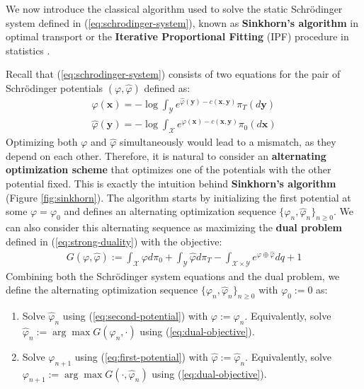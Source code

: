 \documentclass{article}
\newcommand{\boldtext}[1]{\textbf{\textcolor{MyGreen}{#1}}}
\begin{document}
We now introduce the classical algorithm used to solve the static Schrödinger system defined in (\ref{eq:schrodinger-system}), known as \textbf{Sinkhorn's algorithm} in optimal transport \citep{sinkhorn1967diagonal, knight2008sinkhorn, nutz2021introduction, cuturi2013sinkhorn} or the \textbf{Iterative Proportional Fitting} (IPF) procedure in statistics \citep{fortet1940resolution, kullback1968probability, ruschendorf1995convergence}.

Recall that (\ref{eq:schrodinger-system}) consists of two equations for the pair of Schrödinger potentials $(\varphi, \hat{\varphi})$ defined as:
\begin{align}
    \varphi(\boldsymbol{x})=-\log\int_{\mathcal{Y}}e^{\hat{\varphi}(\boldsymbol{y})-c(\boldsymbol{x},\boldsymbol{y})}\pi_T(d\boldsymbol{y})\tag{First Potential}\label{eq:first-potential}\\
    \hat{\varphi}(\boldsymbol{y})=-\log\int_{\mathcal{X}}e^{\varphi(\boldsymbol{x})-c(\boldsymbol{x},\boldsymbol{y})}\pi_0(d\boldsymbol{x})\tag{Second Potential}\label{eq:second-potential}
\end{align}
Optimizing both $\varphi$ and $\hat{\varphi}$ simultaneously would lead to a mismatch, as they depend on each other. Therefore, it is natural to consider an \textbf{alternating optimization scheme} that optimizes one of the potentials with the other potential fixed. This is exactly the intuition behind \boldtext{Sinkhorn's algorithm} (Figure \ref{fig:sinkhorn}). The algorithm starts by initializing the first potential at some $\varphi=\varphi_0$ and defines an alternating optimization sequence $\{\varphi_n, \hat{\varphi}_n\}_{n\geq 0}$. We can also consider this alternating sequence as maximizing the \textbf{dual problem} defined in (\ref{eq:strong-duality}) with the objective:
\begin{align}
    G(\varphi, \hat{\varphi}):=\int_{\mathcal{X}}\varphi d\pi_0+\int_{\mathcal{Y}}\hat{\varphi} d\pi_T-\int_{\mathcal{X}\times\mathcal{Y}} e^{\varphi\oplus \hat{\varphi}}dq+1\tag{Dual Objective}\label{eq:dual-objective}
\end{align}
Combining both the Schrödinger system equations and the dual problem, we define the alternating optimization sequence $\{\varphi_n, \hat{\varphi}_n\}_{n\geq 0}$ with $\varphi_0:=0$ as:
\begin{enumerate}
    \item [(i)] Solve $\hat{\varphi}_n$ using (\ref{eq:second-potential}) with $\varphi:=\varphi_n$. Equivalently, solve $\hat{\varphi}_n:=\arg\max G(\varphi_n, \cdot)$ using (\ref{eq:dual-objective}).
    \item [(ii)] Solve $\varphi_{n+1}$ using (\ref{eq:first-potential}) with $\hat{\varphi}:=\hat{\varphi}_n$. Equivalently, solve $\varphi_{n+1}:=\arg\max G(\cdot , \hat\varphi_n)$ using (\ref{eq:dual-objective}).
\end{enumerate}
\end{document}
